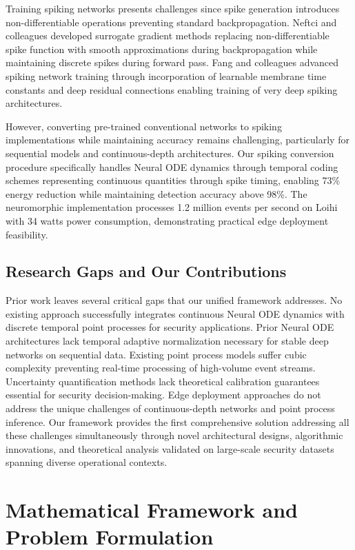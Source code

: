 \documentclass[10pt,journal,compsoc]{IEEEtran}
\begin{document}
Training spiking networks presents challenges since spike generation introduces non-differentiable operations preventing standard backpropagation. Neftci and colleagues developed surrogate gradient methods replacing non-differentiable spike function with smooth approximations during backpropagation while maintaining discrete spikes during forward pass. Fang and colleagues advanced spiking network training through incorporation of learnable membrane time constants and deep residual connections enabling training of very deep spiking architectures.

However, converting pre-trained conventional networks to spiking implementations while maintaining accuracy remains challenging, particularly for sequential models and continuous-depth architectures. Our spiking conversion procedure specifically handles Neural ODE dynamics through temporal coding schemes representing continuous quantities through spike timing, enabling 73\% energy reduction while maintaining detection accuracy above 98\%. The neuromorphic implementation processes 1.2 million events per second on Loihi with 34 watts power consumption, demonstrating practical edge deployment feasibility.

\subsection{Research Gaps and Our Contributions}

Prior work leaves several critical gaps that our unified framework addresses. No existing approach successfully integrates continuous Neural ODE dynamics with discrete temporal point processes for security applications. Prior Neural ODE architectures lack temporal adaptive normalization necessary for stable deep networks on sequential data. Existing point process models suffer cubic complexity preventing real-time processing of high-volume event streams. Uncertainty quantification methods lack theoretical calibration guarantees essential for security decision-making. Edge deployment approaches do not address the unique challenges of continuous-depth networks and point process inference. Our framework provides the first comprehensive solution addressing all these challenges simultaneously through novel architectural designs, algorithmic innovations, and theoretical analysis validated on large-scale security datasets spanning diverse operational contexts.

\section{Mathematical Framework and Problem Formulation}
\label{sec:framework}
\end{document}
